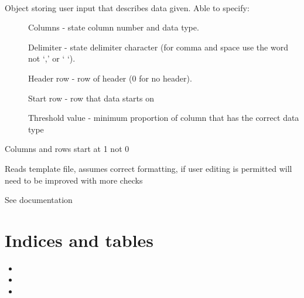 \documentclass[letterpaper,10pt,english]{sphinxmanual}
\begin{document}
\begin{fulllineitems}
\label{Code_rst/temp_rd:template_reader.Template}~\begin{description}
\item[{Object storing user input that describes data given. Able to specify:}] \leavevmode
Columns - state column number and data type.

Delimiter - state delimiter character (for comma and space use the word not `,' or ` `).

Header row - row of header (0 for no header).

Start row - row that data starts on

Threshold value - minimum proportion of column that has the correct data type

\end{description}

Columns and rows start at 1 not 0

\begin{fulllineitems}
\label{Code_rst/temp_rd:template_reader.Template.read}
Reads template file, assumes correct formatting, if user editing
is permitted will need to be improved with more checks

See documentation

\end{fulllineitems}


\end{fulllineitems}



\chapter{Indices and tables}
\label{index:indices-and-tables}\begin{itemize}
\item {} 

\item {} 

\item {} 

\end{itemize}
\end{document}
